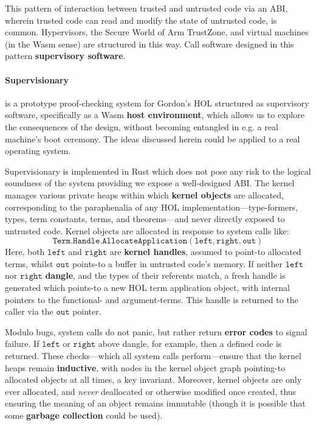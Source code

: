 \documentclass[sigplan, review]{acmart}
\newcommand{\deffont}[1]{\textbf{#1}}
\begin{document}
This pattern of interaction between trusted and untrusted code via an ABI, wherein trusted code can read and modify the state of untrusted code, is common.
Hypervisors, the Secure World of Arm TrustZone, and virtual machines (in the Wasm sense) are structured in this way.
Call software designed in this pattern \deffont{supervisory software}.

\paragraph{Supervisionary} is a prototype proof-checking system for Gordon's HOL structured as supervisory software, specifically as a Wasm \deffont{host environment}, which allows us to explore the consequences of the design, without becoming entangled in e.g. a real machine's boot ceremony.
The ideas discussed herein could be applied to a real operating system.

Supervisionary is implemented in Rust which does not pose any risk to the logical soundness of the system providing we expose a well-designed ABI.
The kernel manages various private heaps within which \deffont{kernel objects} are allocated, corresponding to the paraphenalia of any HOL implementation---type-formers, types, term constants, terms, and theorems---and never directly exposed to untrusted code.
Kernel objects are allocated in response to system calls like:
\begin{displaymath}
\mathtt{Term.Handle.AllocateApplication(left, right, out)}
\end{displaymath}
Here, both $\mathtt{left}$ and $\mathtt{right}$ are \deffont{kernel handles}, assumed to point-to allocated terms, whilst $\mathtt{out}$ points-to a buffer in untrusted code's memory.
If neither $\mathtt{left}$ nor $\mathtt{right}$ \deffont{dangle}, and the types of their referents match, a fresh handle is generated which points-to a new HOL term application object, with internal pointers to the functional- and argument-terms.
This handle is returned to the caller via the $\mathtt{out}$ pointer.

Modulo bugs, system calls do not panic, but rather return \deffont{error codes} to signal failure.
If $\mathtt{left}$ or $\mathtt{right}$ above dangle, for example, then a defined code is returned.
These checks---which all system calls perform---ensure that the kernel heaps remain \deffont{inductive}, with nodes in the kernel object graph pointing-to allocated objects at all times, a key invariant.
Moreover, kernel objects are only ever allocated, and \emph{never} deallocated or otherwise modified once created, thus ensuring the meaning of an object remains immutable (though it is possible that some \deffont{garbage collection} could be used).
\end{document}
